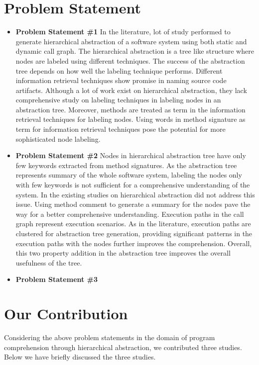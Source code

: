  
\newpage

\section{Problem Statement}

\begin{itemize}
    \item \textbf{Problem Statement \#1} In the literature, lot of study performed to generate hierarchical abstraction of a software system using both static and dynamic call graph. The hierarchical abstraction is a tree like structure where nodes are labeled using different techniques. The success of the abstraction tree depends on how well the labeling technique performs. Different information retrieval techniques show promise in naming source code artifacts. Although a lot of work exist on hierarchical abstraction, they lack comprehensive study on labeling techniques in labeling nodes in an abstraction tree. Moreover, methods are treated as term in the information retrieval techniques for labeling nodes. Using words in method signature as term for information retrieval techniques pose the potential for more sophisticated node labeling. 
    
    \item \textbf{Problem Statement \#2}
    Nodes in hierarchical abstraction tree have only few keywords extracted from method signatures. As the abstraction tree represents summary of the whole software system, labeling the nodes only with few keywords is not sufficient for a comprehensive understanding of the system. In the existing studies on hierarchical abstraction did not address this issue. Using method comment to generate a summary for the nodes  pave the way for a better comprehensive understanding. Execution paths in the call graph represent execution scenarios. As in the literature, execution paths are clustered for abstraction tree generation, providing significant patterns in the execution paths with the nodes further improves the comprehension. Overall, this two property addition in the abstraction tree improves the overall usefulness of the tree. 

    \item \textbf{Problem Statement \#3} 
    
    
\end{itemize}



\section{Our Contribution}
Considering the above problem statements in the domain of program comprehension through hierarchical abstraction, we contributed three studies. Below we have briefly discussed the three studies.  

